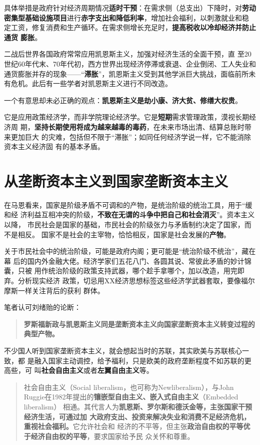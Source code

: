 具体举措是政府针对经济周期情况\textbf{适时干预}：在需求侧（总支出）下降时，对\textbf{劳动
  密集型基础设施项目}进行\textbf{赤字支出和降低利率}，增加社会福利，以刺激就业和稳
定工资，修复消费和生产循环。在需求侧增长充足时，\textbf{提高税收以冷却经济并防止通货
膨胀}。


二战后世界各国政府常常应用凯恩斯主义，加强对经济生活的全面干预，直
至20世纪60年代末、70年代初，西方世界出现经济停滞或衰退、企业倒闭、工人失业和
通货膨胀并存的现象——“\textbf{滞胀}”，凯恩斯主义受到其他学派巨大挑战，面临前所未
有危机。此后有一些学者对凯恩斯主义进行不同改造。

一个有意思却未必正确的观点：\textbf{凯恩斯主义是劫小康、济大贫、修缮大权贵}。

它是应用政策经济学，而非学院理论经济学。它是\textbf{短期}需求管理政策，漠视长期经济周
期，\textbf{坚持长期使用将成为越来越毒的毒药}，在未来市场出清、结算总账时带来更加巨大
的灾难，包括但不限于“滞胀”；如同任何经济学说一样，它不能消除资本主义经济固
有的基本矛盾。

\section{从垄断资本主义到国家垄断资本主义}

在马恩看来，国家是阶级矛盾不可调和的产物，是统治阶级的统治工具，用于“缓和经
济利益互相冲突的阶级，\textbf{不致在无谓的斗争中把自己和社会消灭}”。资本主义以降，
市民社会是国家的基础，市民社会的阶级张力与矛盾制约决定了国家，而不是相反。
国家不是社会的主宰物，恰恰相反，国家是社会发展的\textbf{产物}。

关于市民社会中的统治阶级，可能是政府内阁；更可能是“统治阶级不统治”，藏在幕
后的国内外金融大佬。经济学家们五花八门、各圆其说、常彼此矛盾的妙计锦囊，只被
用作统治阶级的政策支持武器，哪个趁手拿哪个，加以改造，用完即弃。分析现实经济
政策，切忌用XX经济思想标签这些经济学武器套取，要像福尔摩斯一样关注背后的获利
群体。

笔者认可刘绪贻的论断：
\begin{quotation}
  \textbf{罗斯福新政与凯恩斯主义同是垄断资本主义向国家垄断资本主义转变过程的典型产物。}
\end{quotation}

不少国人听到国家垄断资本主义，就会想起当时的苏联，其实欧美与苏联核心一致，都
是融入国家主动调控，给予福利，只是欧美的政府垄断程度不如苏联的更高些，可
叫\textbf{社会自由主义}或者\textbf{左翼自由主义}等。
\begin{quotation}
  社会自由主义（Social liberalism，也可称为Newliberalism），与John
  Ruggie在1982年提出的\textbf{镶嵌型自由主义、嵌入式自由主义}（Embedded liberalism）
  相通。其代言人为\textbf{凯恩斯、罗尔斯和德沃金等，主张国家干预经济生活，可通过加
    大政府支出、投资来解决失业和消费不足经济危机，重视社会福利。}它允许社会和
  经济的不平等，但主张\textbf{政治自由权的平等优于经济自由权的平等}，要求国家给予民
  众关怀和尊重。\cite{newneo}
\end{quotation}


